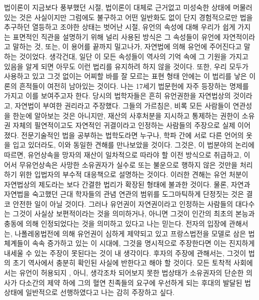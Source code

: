 법이론이 지금보다 풍부했던 시절,
법이론이 대체로 근거없고 미성숙한 상태에 머물러 있는 것은 사실이지만
그럼에도 불구하고 어떤 일반화도 없이 단지
경험적으로만 법을 추구하던 열등하고 조야한 상태는 벗어난 시절,
유언의 속성에 대해 우리가 쉽게 가지는 표면적인 직관을 설명하기 위해
널리 사용된 방식은
그 속성들이 유언에 자연적이라고 말하는 것,
또는, 이 용어를 끝까지 밀고나가,
자연법에 의해 유언에 주어진다고 말하는 것이었다.
생각건대,
일단 이 모든 속성들이
역사의 기억 속에 그 기원을 가지고 있음을 알게 되면
아무도 이런 법리를 유지하려 하지 않을 것이다.
또한,
우리 모두가 사용하고 있고
그것 없이는 어찌할 바를 잘 모르는 표현 형태 안에는
이 법리를 낳은 이론의 흔적들이
여전히 남아있는 것이다.
나는 17세기 법문헌에 자주 등장하는 명제를 가지고 이를 보여주고자 한다.
당시의 법학자들은 흔히 유언권한을 자연법상의 것이라고,
자연법이 부여한 권리라고 주장했다.
그들의 가르침은,
비록 모든 사람들이 연관성을 한눈에 알아보는 것은 아니지만,
재산의 사후처분을 지시하고 통제하는 권한이
소유권 자체의 필연적이고도 자연적인 귀결이라고
인정하는 사람들의 주장으로 실제 이어졌다.
전문기술적인 법을 공부하는 법학도라면 누구나,
학파 간에 서로 다른 언어의 옷을 입고 있더라도,
이와 동일한 견해를 만나보았을 것이다.
그것은, 이 법분야의 논리에 따르면,
유언상속을
망자의 재산이 일차적으로 따라야 할 이전 방식으로 취급하고,
이어서 무유언상속은
사망한 소유권자가 실수로 또는 불운으로
행하지 않은 것만을 처리하기 위한 입법자의 부수적 대응책으로
설명하는 것이다.
이러한 견해는 유언 처분이 자연법상의 제도라는 보다 간결한 법리가 확장된
형태에 불과한 것이다.
물론, 자연과 자연법을 숙고했던 근대 학자들의 관념 연관의 범위를
도그마틱하게 단정짓는 것은 결코 안전한 일이 아닐 것이다.
그러나 유언권이 자연권이라고 인정하는 사람들의 대다수는
그것이 사실상 보편적이라는 것을 의미하거나, 아니면
그것이 인간의 최초의 본능과 충동에 의해 인정되었다는 것을 의미하고 있다고
나는 믿는다.
전자의 입장에 관해서는,
나폴레옹법전에 의해 유언권이 심하게 제약되고 있고
프랑스법전을 모델로 삼은 법체계들이 속속 증가하고 있는 이 시대에,
그것을 명시적으로 주장한다면
이는 진지하게 내세울 수 있는 주장이 못된다는 것이 내 생각이다.
후자의 주장에 관해서는,
그것이 법의 초기 역사에서 충분히 확인된 사실에 반한다고 해야 할 것이다.
모든 토착적 사회에서는 유언이 허용되지 ,
아니, 생각조차 되어보지 못한 법상태가
소유권자의 단순한 의사가 다소간의 제약 하에
그의 혈연 친족들의 요구에 우선하게 되는 후대의 발달된 법상태에
일반적으로 선행하였다고
나는 감히 주장하고 싶다.

